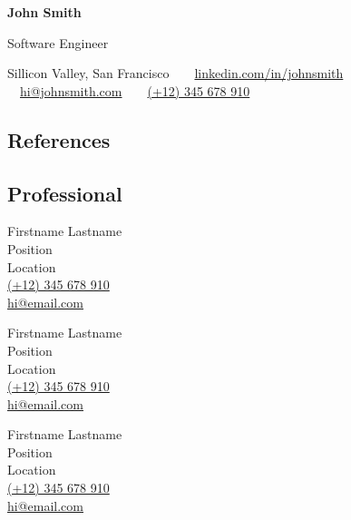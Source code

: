 \documentclass[10pt,a4paper]{article}
\begin{document}

\begin{center}
	{\LARGE \textbf{John Smith}}\vspace{0.2cm}
				
	{\large Software Engineer}\vspace{0.2cm}
				
	Sillicon Valley, San Francisco\ \ \textbullet \ \
	\href{https://linkedin.com/in/johnsmith}{linkedin.com/in/johnsmith} \textbullet \ \
	\href{mailto:hi@johnsmith.com}{hi@johnsmith.com}\ \ \textbullet \ \
	\href{tel:+12345678910}{(+12) 345 678 910} \ \
\end{center}



\subsection*{\textcolor{accent}{\Large References  \sout{\hfill}}}\vspace{0.5cm}

\subsection*{Professional}\vspace{0.25cm}

\begin{multicols}{2}
	{\large Firstname Lastname}\\
	Position\\
	Location\\
	\href{tel:+12345678910}{(+12) 345 678 910}\\
	\href{mailto:hi@email.com}{hi@email.com}\\
	\vspace{0.15cm}

	{\large Firstname Lastname}\\
	Position\\
	Location\\
	\href{tel:+12345678910}{(+12) 345 678 910}\\
	\href{mailto:hi@email.com}{hi@email.com}\\
	\vspace{0.15cm}

	\columnbreak

	{\large Firstname Lastname}\\
	Position\\
	Location\\
	\href{tel:+12345678910}{(+12) 345 678 910}\\
	\href{mailto:hi@email.com}{hi@email.com}\\
	\vspace{0.15cm}
\end{multicols}
\end{document}

